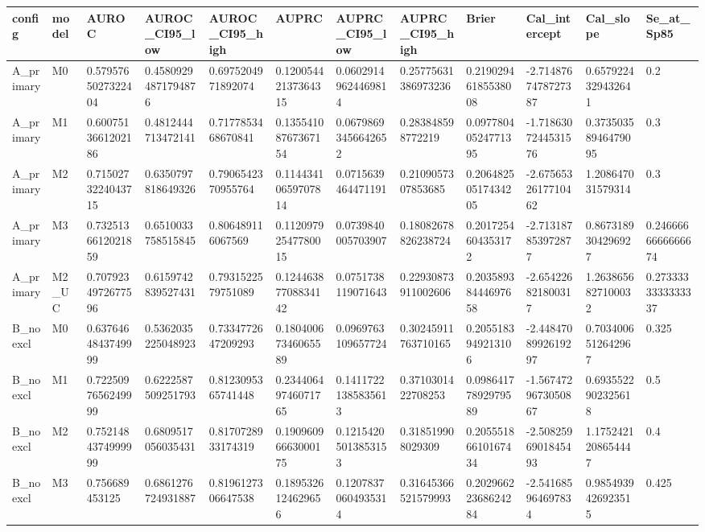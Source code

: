 \begin{tabular}{llllllllllll}
\toprule
config & model & AUROC & AUROC\_CI95\_low & AUROC\_CI95\_high & AUPRC & AUPRC\_CI95\_low & AUPRC\_CI95\_high & Brier & Cal\_intercept & Cal\_slope & Se\_at\_Sp85 \\
\midrule
A\_primary & M0 & 0.5795765027322404 & 0.45809294871794876 & 0.6975204971892074 & 0.12005442137364315 & 0.06029149624469814 & 0.25775631386973236 & 0.21902946185538008 & -2.7148767478727387 & 0.6579224329432641 & 0.2 \\
A\_primary & M1 & 0.6007513661202186 & 0.4812444713472141 & 0.7177853468670841 & 0.13554108767367154 & 0.06798693456642652 & 0.283848598772219 & 0.09778040524771395 & -1.7186307244531576 & 0.37350358946479095 & 0.3 \\
A\_primary & M2 & 0.7150273224043715 & 0.6350797818649326 & 0.7906542370955764 & 0.11443410659707814 & 0.0715639464471191 & 0.2109057307853685 & 0.20648250517434205 & -2.6756532617710462 & 1.208647031579314 & 0.3 \\
A\_primary & M3 & 0.7325136612021859 & 0.6510033758515845 & 0.806489116067569 & 0.11209792547780015 & 0.0739840005703907 & 0.18082678826238724 & 0.2017254604353172 & -2.713187853972877 & 0.8673189304296927 & 0.2466666666666674 \\
A\_primary & M2\_UC & 0.7079234972677596 & 0.6159742839527431 & 0.7931522579751089 & 0.12446387708834142 & 0.0751738119071643 & 0.22930873911002606 & 0.20358938444697658 & -2.654226821800317 & 1.2638656827100032 & 0.2733333333333337 \\
B\_noexcl & M0 & 0.6376464843749999 & 0.5362035225048923 & 0.7334772647209293 & 0.18040067346065589 & 0.0969763109657724 & 0.30245911763710165 & 0.2055183949213106 & -2.4484708992619297 & 0.7034006512642967 & 0.325 \\
B\_noexcl & M1 & 0.7225097656249999 & 0.6222587509251793 & 0.8123095365741448 & 0.23440649746071765 & 0.14117221385835613 & 0.3710301422708253 & 0.09864177892979589 & -1.5674729673050867 & 0.6935522902325618 & 0.5 \\
B\_noexcl & M2 & 0.7521484374999999 & 0.6809517056035431 & 0.8170728933174319 & 0.19096096663000175 & 0.12154205013853153 & 0.318519908029309 & 0.20555186610167434 & -2.5082596901845493 & 1.1752421208654447 & 0.4 \\
B\_noexcl & M3 & 0.756689453125 & 0.6861276724931887 & 0.8196127306647538 & 0.1895326124629656 & 0.12078370604935314 & 0.31645366521579993 & 0.20296622368624284 & -2.541685964697834 & 0.9854939426923515 & 0.425 \\

\end{tabular}
